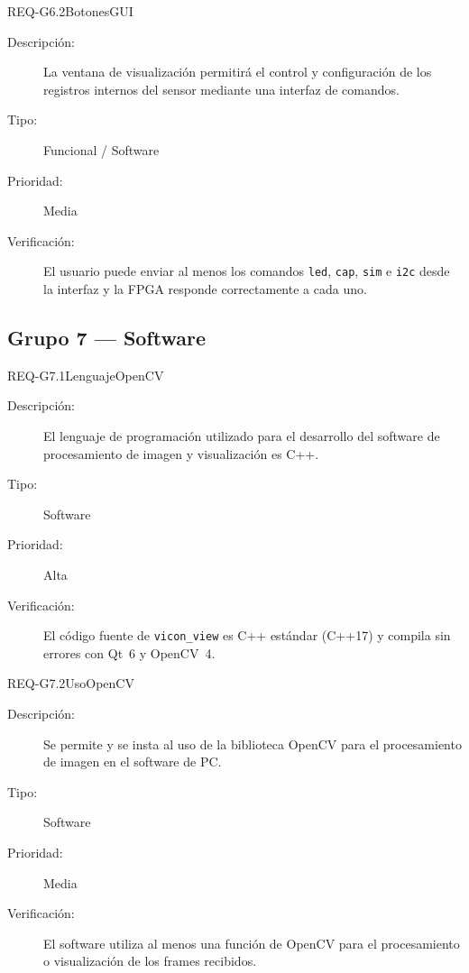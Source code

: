 \documentclass[../main.tex]{subfiles}
\begin{document}
\begin{requisito}{REQ-G6.2}{BotonesGUI}
\begin{description}
    \item[Descripción:]   La ventana de visualización permitirá el control y configuración de los registros internos del sensor mediante una interfaz de comandos.
    \item[Tipo:]          Funcional / Software
    \item[Prioridad:]     Media
    \item[Verificación:]  El usuario puede enviar al menos los comandos \texttt{led}, \texttt{cap}, \texttt{sim} e \texttt{i2c} desde la interfaz y la FPGA responde correctamente a cada uno.
\end{description}
\end{requisito}

\subsection{Grupo 7 — Software}

\begin{requisito}{REQ-G7.1}{LenguajeOpenCV}
\begin{description}
    \item[Descripción:]   El lenguaje de programación utilizado para el desarrollo del software de procesamiento de imagen y visualización es C++.
    \item[Tipo:]          Software
    \item[Prioridad:]     Alta
    \item[Verificación:]  El código fuente de \texttt{vicon\_view} es C++ estándar (C++17) y compila sin errores con Qt~6 y OpenCV~4.
\end{description}
\end{requisito}

\begin{requisito}{REQ-G7.2}{UsoOpenCV}
\begin{description}
    \item[Descripción:]   Se permite y se insta al uso de la biblioteca OpenCV para el procesamiento de imagen en el software de PC.
    \item[Tipo:]          Software
    \item[Prioridad:]     Media
    \item[Verificación:]  El software utiliza al menos una función de OpenCV para el procesamiento o visualización de los frames recibidos.
\end{description}
\end{requisito}
\end{document}
